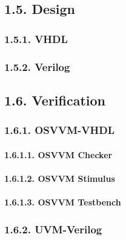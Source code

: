\documentclass[
]{article}
\begin{document}
\hypertarget{design}{%
\subsection{1.5. Design}\label{design}}

\hypertarget{vhdl-2}{%
\subsubsection{1.5.1. VHDL}\label{vhdl-2}}

\hypertarget{verilog-2}{%
\subsubsection{1.5.2. Verilog}\label{verilog-2}}

\hypertarget{verification}{%
\subsection{1.6. Verification}\label{verification}}

\hypertarget{osvvm-vhdl}{%
\subsubsection{1.6.1. OSVVM-VHDL}\label{osvvm-vhdl}}

\hypertarget{osvvm-checker}{%
\paragraph{1.6.1.1. OSVVM Checker}\label{osvvm-checker}}

\hypertarget{osvvm-stimulus}{%
\paragraph{1.6.1.2. OSVVM Stimulus}\label{osvvm-stimulus}}

\hypertarget{osvvm-testbench}{%
\paragraph{1.6.1.3. OSVVM Testbench}\label{osvvm-testbench}}

\hypertarget{uvm-verilog}{%
\subsubsection{1.6.2. UVM-Verilog}\label{uvm-verilog}}
\end{document}
